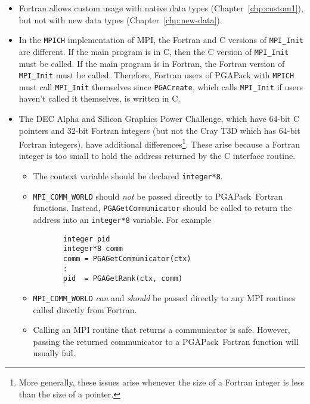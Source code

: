 \documentclass{report}
\newcommand{\pga}{PGAPack}
\begin{document}
\begin{itemize}
\item Fortran allows custom usage with native data types
(Chapter~\ref{chp:custom1}), but not with new data types
(Chapter~\ref{chp:new-data}).

\item In the {\tt MPICH} implementation of MPI, the Fortran and C versions of
{\tt MPI\_Init} are different.  If the main program is in C, then the C
version of {\tt MPI\_Init} must be called.  If the main program is in Fortran,
the Fortran version of {\tt MPI\_Init} must be called.  Therefore, Fortran
users of PGAPack with {\tt MPICH} must call {\tt MPI\_Init} themselves since
{\tt PGACreate}, which calls {\tt MPI\_Init} if users haven't called it
themselves, is written in C.

\item The DEC Alpha and Silicon Graphics Power Challenge, which have
64-bit C pointers and 32-bit Fortran integers (but not the Cray T3D which has
64-bit Fortran integers), have additional differences\footnote{More generally,
these issues arise whenever the size of a Fortran integer is less than the
size of a pointer.}.  These arise because a Fortran integer is too small to
hold the address returned by the C interface routine.

\begin{sloppypar}
\begin{itemize}

\item The context variable should be declared {\tt integer*8}. 

\item {\tt MPI\_COMM\_WORLD} should {\em not} be passed directly to 
\pga\ Fortran functions.  Instead, {\tt PGAGetCommunicator} should be
called to return the address into an {\tt integer*8} variable.  
For example
\begin{verbatim}
       integer pid
       integer*8 comm
       comm = PGAGetCommunicator(ctx)
       :
       pid  = PGAGetRank(ctx, comm)       
\end{verbatim}

\item {\tt MPI\_COMM\_WORLD} {\em can} and {\em should} be passed directly to
any MPI routines called directly from Fortran.

\item Calling an MPI routine that returns a communicator is safe.  However,
passing the returned communicator to a \pga\ Fortran function will usually
fail.


\end{itemize}
\end{sloppypar}

\end{itemize}
\end{document}
